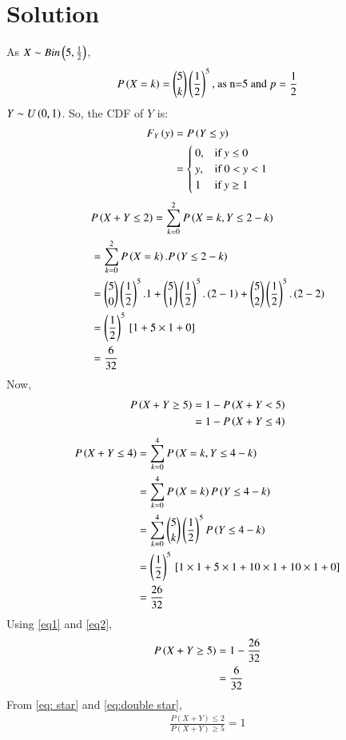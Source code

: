 \documentclass[journal,12pt,twocolumn]{IEEEtran}
\begin{document}
\section{Solution}
As $X\sim Bin\left(5, \frac{1}{2}\right)$,
\begin{align}
    P\left(X=k\right) = \binom{5}{k}\left(\frac{1}{2}\right)^5 \text{, as n=5 and } p =\frac{1}{2}
\end{align}
$Y\sim U\left(0,1\right)$. So, the CDF of $Y$ is:
\begin{align}
    F_Y \left(y\right) &= P\left(Y \le y\right)\\
    & = \begin{cases}
      0, & \text{if}\ y\le 0 \\
      y,  & \text{if}\ 0<y<1 \\
      1 & \text{if}\ y\ge 1
    \end{cases}
\end{align}
\begin{align}
    &P\left(X+Y \le 2\right) =\sum_{k=0}^{2} P\left(X=k, Y\le 2-k\right)\\
    &= \sum_{k=0}^{2} P\left(X=k\right).P\left(Y\le 2-k\right)\\
    &= \binom{5}{0}\left(\frac{1}{2}\right)^5. 1 + \binom{5}{1}\left(\frac{1}{2}\right)^5.\left(2-1\right) + \binom{5}{2}\left(\frac{1}{2}\right)^5.\left(2-2\right)\\
    &= \left(\frac{1}{2}\right)^5 {}\left[1+ 5\times 1 + 0 \right]\\
    &= \frac{6}{32}\label{eq: star}
\end{align}
Now,
\begin{align}
    P\left(X+Y\ge 5\right) &= 1-P\left(X+Y<5\right)\\
    &= 1-P\left(X+Y\le4\right) \label{eq1}
\end{align}
\begin{align}
    P\left(X+Y \le 4\right) &=\sum_{k=0}^{4} P\left(X=k, Y\le 4-k\right)\\
    &=\sum_{k=0}^{4} P\left(X=k\right) P\left(Y\le 4-k\right)\\
    &= \sum_{k=0}^{4} \binom{5}{k} \left(\frac{1}{2}\right)^5 P\left(Y\le 4-k\right) \\
    &= \left(\frac{1}{2}\right)^5 {}\left[ 1\times1 + 5\times1 + 10\times 1 + 10\times1 + 0\right]\\
    &= \frac{26}{32} \label{eq2}
\end{align}
Using \eqref{eq1} and \eqref{eq2},
\begin{align}
    P\left(X+Y\ge 5\right) &= 1 -\frac{26}{32}\\
    &= \frac{6}{32} \label{eq:double star}
\end{align}
From \eqref{eq: star} and \eqref{eq:double star},
\begin{align}
    \frac{P(X+Y) \le 2}{P(X+Y) \ge 5} = 1
\end{align}
\end{document}
